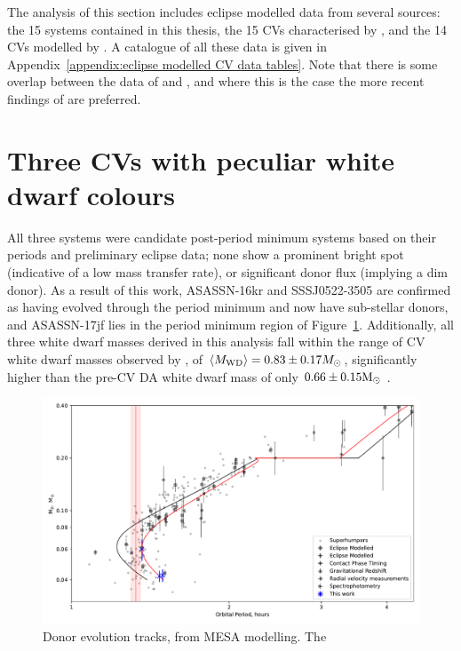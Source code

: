 \label{chpt:discussion} %

The analysis of this section includes eclipse modelled data from several sources: the 15 systems contained in this thesis, the 15 CVs characterised by \citet{McAllister2019}, and the 14 CVs modelled by \citet{Savoury2011}. A catalogue of all these data is given in Appendix~\ref{appendix:eclipse modelled CV data tables}. Note that there is some overlap between the data of \citet{McAllister2019} and \citet{Savoury2011}, and where this is the case the more recent findings of \citet{McAllister2019} are preferred.


\section{Three CVs with peculiar white dwarf colours}
\label{sect:discussion:three CVs with peculiar white dwarf colours}

All three systems were candidate post-period minimum systems based on their periods and preliminary eclipse data; none show a prominent bright spot (indicative of a low mass transfer rate), or significant donor flux (implying a dim donor).
As a result of this work, ASASSN-16kr and SSSJ0522-3505 are confirmed as having evolved through the period minimum and now have sub-stellar donors, and ASASSN-17jf lies in the period minimum region of Figure~\ref{fig:M2_vs_P}.
Additionally, all three white dwarf masses derived in this analysis fall within the range of CV white dwarf masses observed by \citet{pala2020}, of $\langle M_{\rm WD}\rangle = 0.83 \pm 0.17 M_\odot$, significantly higher than the pre-CV DA white dwarf mass of only $0.66 \pm 0.15 {\rm M_\odot}$ \citep{mccleery2020}.


\begin{figure}
    \centering
    \includegraphics[width=\textwidth]{figures/results/three_cvs_with_weird_colours/GeneralFigs/M2_vs_P_withhumpers.pdf}
    \caption{Donor evolution tracks, from MESA modelling. The }
    \label{fig:M2_vs_P}
\end{figure}

